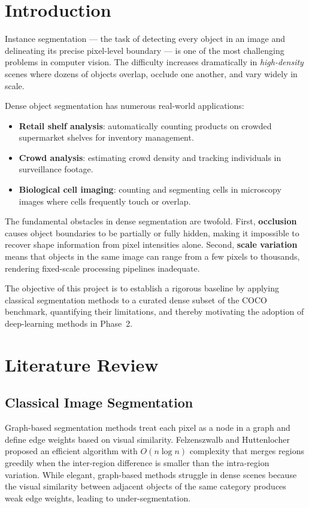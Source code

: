 \documentclass[12pt, a4paper]{article}
\begin{document}
\tableofcontents
\newpage

\section{Introduction}

Instance segmentation — the task of detecting every object in an image and
delineating its precise pixel-level boundary — is one of the most challenging
problems in computer vision.  The difficulty increases dramatically in
\emph{high-density} scenes where dozens of objects overlap, occlude one
another, and vary widely in scale.

Dense object segmentation has numerous real-world applications:
\begin{itemize}
    \item \textbf{Retail shelf analysis}: automatically counting products on
          crowded supermarket shelves for inventory management.
    \item \textbf{Crowd analysis}: estimating crowd density and tracking
          individuals in surveillance footage.
    \item \textbf{Biological cell imaging}: counting and segmenting cells in
          microscopy images where cells frequently touch or overlap.
\end{itemize}

The fundamental obstacles in dense segmentation are twofold.  First,
\textbf{occlusion} causes object boundaries to be partially or fully hidden,
making it impossible to recover shape information from pixel intensities
alone.  Second, \textbf{scale variation} means that objects in the same image
can range from a few pixels to thousands, rendering fixed-scale processing
pipelines inadequate.

The objective of this project is to establish a rigorous baseline by applying
classical segmentation methods to a curated dense subset of the COCO
benchmark, quantifying their limitations, and thereby motivating the adoption
of deep-learning methods in Phase~2.

\section{Literature Review}

\subsection{Classical Image Segmentation}
Graph-based segmentation methods treat each pixel as a node in a graph and
define edge weights based on visual similarity.  Felzenszwalb and
Huttenlocher~\cite{felzenszwalb2004} proposed an efficient algorithm with
$O(n \log n)$ complexity that merges regions greedily when the inter-region
difference is smaller than the intra-region variation.  While elegant,
graph-based methods struggle in dense scenes because the visual similarity
between adjacent objects of the same category produces weak edge weights,
leading to under-segmentation.
\end{document}
